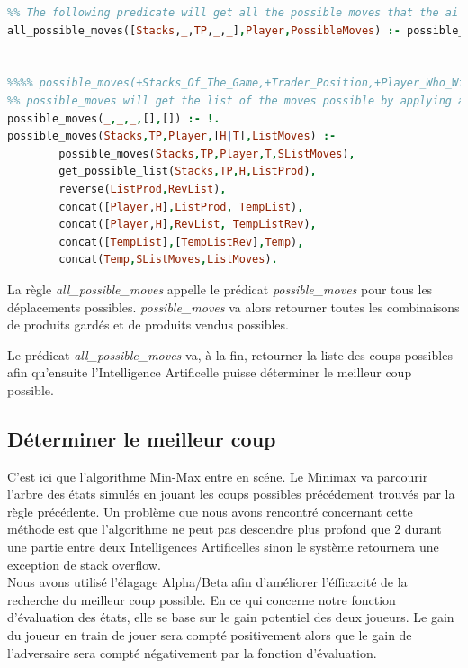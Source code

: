 \documentclass[a4paper, 11pt,twoside, leqno]{report}
\theoremstyle{plain}
\begin{document}
\begin{lstlisting}[language=prolog]
%%%% all_possible_moves(+State_Of_The_Game,+Player_Who_Will_Make_The_Move,?Possible_Moves)
%% The following predicate will get all the possible moves that the ai could make.
all_possible_moves([Stacks,_,TP,_,_],Player,PossibleMoves) :- possible_moves(Stacks,TP,Player,[1,2,3],PossibleMoves).


%%%% possible_moves(+Stacks_Of_The_Game,+Trader_Position,+Player_Who_Will_Make_The_Move,+List_Of_Jumps_To_make,?List_Of_Moves)
%% possible_moves will get the list of the moves possible by applying all the jumps given in the fourth parameter. In that game the list should be [1,2,3].
possible_moves(_,_,_,[],[]) :- !.
possible_moves(Stacks,TP,Player,[H|T],ListMoves) :-
		possible_moves(Stacks,TP,Player,T,SListMoves), 
		get_possible_list(Stacks,TP,H,ListProd),
		reverse(ListProd,RevList),
		concat([Player,H],ListProd, TempList),
		concat([Player,H],RevList, TempListRev),
		concat([TempList],[TempListRev],Temp),
		concat(Temp,SListMoves,ListMoves).
\end{lstlisting}

La règle \textit{all\_{}possible\_{}moves} appelle le prédicat \textit{possible\_{}moves} pour tous les déplacements possibles. \textit{possible\_{}moves} va alors retourner toutes les combinaisons de produits gardés et de produits vendus possibles.

Le prédicat \textit{all\_{}possible\_{}moves} va, à la fin, retourner la liste des coups possibles afin qu'ensuite l'Intelligence Artificelle puisse déterminer le meilleur coup possible.

\subsection{Déterminer le meilleur coup}
C'est ici que l'algorithme Min-Max entre en scéne. Le Minimax va parcourir l'arbre des états simulés en jouant les coups possibles précédement trouvés par la règle précédente. Un problème que nous avons rencontré concernant cette méthode est que l'algorithme ne peut pas descendre plus profond que 2 durant une partie entre deux Intelligences Artificelles sinon le système retournera une exception de stack overflow.\\

Nous avons utilisé l'élagage Alpha/Beta afin d'améliorer l'éfficacité de la recherche du meilleur coup possible. En ce qui concerne notre fonction d'évaluation des états, elle se base sur le gain potentiel des deux joueurs. Le gain du joueur en train de jouer sera compté positivement alors que le gain de l'adversaire sera compté négativement par la fonction d'évaluation. \\
\end{document}
